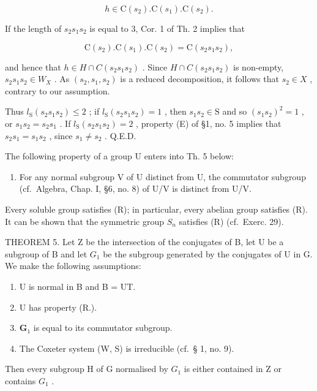 \[
h \in \mathrm{C} (s _ {2}). \mathrm{C} (s _ {1}). \mathrm{C} (s _ {2}).
\]

If the length of \(s_2s_1s_2\) is equal to 3, Cor. 1 of Th. 2 implies that

\[
\mathrm{C} (s _ {2}). \mathrm{C} (s _ {1}). \mathrm{C} (s _ {2}) = \mathrm{C} (s _ {2} s _ {1} s _ {2}),
\]

and hence that \(h \in H \cap C(s_{2}s_{1}s_{2})\) . Since \(H \cap C(s_{2}s_{1}s_{2})\) is non-empty, \(s_{2}s_{1}s_{2} \in W_{X}\) . As \((s_{2}, s_{1}, s_{2})\) is a reduced decomposition, it follows that \(s_{2} \in X\) , contrary to our assumption.

Thus \(l_{\mathrm{S}}(s_2s_1s_2) \leqslant 2\) ; if \(l_{\mathrm{S}}(s_2s_1s_2) = 1\) , then \(s_1s_2 \in \mathrm{S}\) and so \((s_1s_2)^2 = 1\) , or \(s_1s_2 = s_2s_1\) . If \(l_{\mathrm{S}}(s_2s_1s_2) = 2\) , property (E) of §1, no. 5 implies that \(s_2s_1 = s_1s_2\) , since \(s_1 \neq s_2\) . Q.E.D.

The following property of a group U enters into Th. 5 below:

\begin{enumerate}
\def\labelenumi{(\Alph{enumi})}
\setcounter{enumi}{17}
\tightlist
\item
  For any normal subgroup V of U distinct from U, the commutator subgroup (cf.~Algebra, Chap. I, §6, no. 8) of U/V is distinct from U/V.
\end{enumerate}

Every soluble group satisfies (R); in particular, every abelian group satisfies (R). It can be shown that the symmetric group \(S_{n}\) satisfies (R) (cf.~Exerc. 29).

THEOREM 5. Let Z be the intersection of the conjugates of B, let U be a subgroup of B and let \(G_{1}\) be the subgroup generated by the conjugates of U in G. We make the following assumptions:

\begin{enumerate}
\def\labelenumi{(\arabic{enumi})}
\item
  U is normal in B and B = UT.
\item
  U has property (R.).
\item
  \(\mathbf{G}_1\) is equal to its commutator subgroup.
\item
  The Coxeter system (W, S) is irreducible (cf.~§ 1, no. 9).
\end{enumerate}

Then every subgroup H of G normalised by \(G_{1}\) is either contained in Z or contains \(G_{1}\) .

